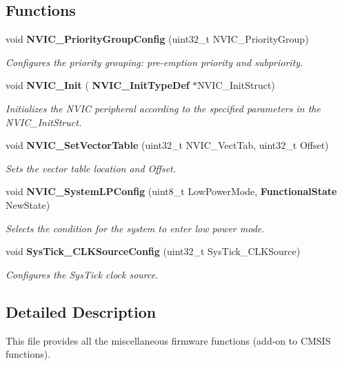 \subsection*{Functions}
\begin{DoxyCompactItemize}
\item 
void \textbf{ N\+V\+I\+C\+\_\+\+Priority\+Group\+Config} (uint32\+\_\+t N\+V\+I\+C\+\_\+\+Priority\+Group)
\begin{DoxyCompactList}\small\item\em Configures the priority grouping\+: pre-\/emption priority and subpriority. \end{DoxyCompactList}\item 
void \textbf{ N\+V\+I\+C\+\_\+\+Init} (\textbf{ N\+V\+I\+C\+\_\+\+Init\+Type\+Def} $\ast$N\+V\+I\+C\+\_\+\+Init\+Struct)
\begin{DoxyCompactList}\small\item\em Initializes the N\+V\+IC peripheral according to the specified parameters in the N\+V\+I\+C\+\_\+\+Init\+Struct. \end{DoxyCompactList}\item 
void \textbf{ N\+V\+I\+C\+\_\+\+Set\+Vector\+Table} (uint32\+\_\+t N\+V\+I\+C\+\_\+\+Vect\+Tab, uint32\+\_\+t Offset)
\begin{DoxyCompactList}\small\item\em Sets the vector table location and Offset. \end{DoxyCompactList}\item 
void \textbf{ N\+V\+I\+C\+\_\+\+System\+L\+P\+Config} (uint8\+\_\+t Low\+Power\+Mode, \textbf{ Functional\+State} New\+State)
\begin{DoxyCompactList}\small\item\em Selects the condition for the system to enter low power mode. \end{DoxyCompactList}\item 
void \textbf{ Sys\+Tick\+\_\+\+C\+L\+K\+Source\+Config} (uint32\+\_\+t Sys\+Tick\+\_\+\+C\+L\+K\+Source)
\begin{DoxyCompactList}\small\item\em Configures the Sys\+Tick clock source. \end{DoxyCompactList}\end{DoxyCompactItemize}


\subsection{Detailed Description}
This file provides all the miscellaneous firmware functions (add-\/on to C\+M\+S\+IS functions). 

